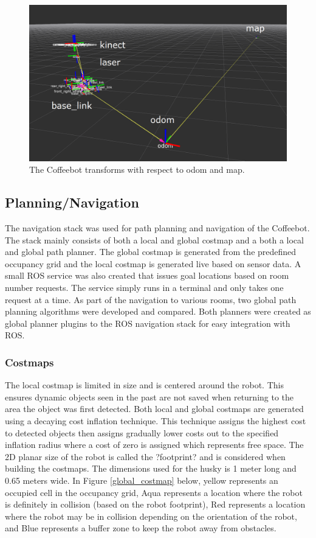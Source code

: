 \documentclass[letterpaper, 10 pt, conference]{ieeeconf}  %
\begin{document}
	\begin{figure}[!ht]
		\centering
		\includegraphics[width=1.0\columnwidth]{Figures/Transforms}
		\caption{The Coffeebot transforms with respect to odom and map.}
		\label{transforms}
	\end{figure}

\subsection{Planning/Navigation}

The navigation stack was used for path planning and navigation of the Coffeebot. The stack mainly consists of both a local and global costmap and a both a local and global path planner. The global costmap is generated from the predefined occupancy grid and the local costmap is generated live based on sensor data. A small ROS service was also created that issues goal locations based on room number requests. The service simply runs in a terminal and only takes one request at a time. As part of the navigation to various rooms, two global path planning algorithms were developed and compared. Both planners were created as global planner plugins to the ROS navigation stack for easy integration with ROS.

\subsubsection{Costmaps}
The local costmap is limited in size and is centered around the robot. This ensures dynamic objects seen in the past are not saved when returning to the area the object was first detected. Both local and global costmaps are generated using a decaying cost inflation technique. This technique assigns the highest cost to detected objects then assigns gradually lower costs out to the specified inflation radius where a cost of zero is assigned which represents free space. The 2D planar size of the robot is called the ?footprint? and is considered when building the costmaps. The dimensions used for the husky is 1 meter long and 0.65 meters wide. In Figure \ref{global_costmap} below, yellow represents an occupied cell in the occupancy grid, Aqua represents a location where the robot is definitely in collision (based on the robot footprint), Red represents a location where the robot may be in collision depending on the orientation of the robot, and Blue represents a buffer zone to keep the robot away from obstacles.
\end{document}
